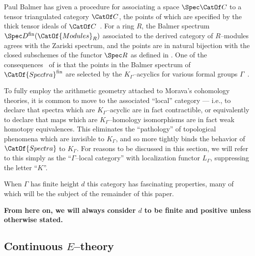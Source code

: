 \begin{remark}
Paul Balmer has given a procedure for associating a space $\Spec \CatOf C$ to a tensor triangulated category $\CatOf C$, the points of which are specified by the thick tensor ideals of $\CatOf C$~\cite{Balmer}.  For a ring $R$, the Balmer spectrum $\Spec D^{\text{fin}}(\CatOf{Modules}_R)$ associated to the derived category of $R$--modules agrees with the Zariski spectrum, and the points are in natural bijection with the closed subschemes of the functor $\Spec R$ as defined in .  One of the consequences~\cite[Theorem 7]{HopkinsSmith} of  is that the points in the Balmer spectrum of $\CatOf{Spectra}^{\text{fin}}$ are selected by the $K_\Gamma$--acyclics for various formal groups $\Gamma$~\cite[Corollary 9.5]{Balmer}.
\end{remark}




\label{KLocalCategory}

To fully employ the arithmetic geometry attached to Morava's cohomology theories, it is common to move to the associated ``local'' category --- i.e., to declare that spectra which are $K_\Gamma$--acyclic are in fact contractible, or equivalently to declare that maps which are $K_\Gamma$--homology isomorphisms are in fact weak homotopy equivalences.  This eliminates the ``pathology'' of topological phenomena which are invisible to $K_\Gamma$, and so more tightly binds the behavior of $\CatOf{Spectra}$ to $K_\Gamma$.  For reasons to be discussed in this section, we will refer to this simply as the ``$\Gamma$--local category'' with localization functor $L_\Gamma$, suppressing the letter ``$K$''.

When $\Gamma$ has finite height $d$ this category has fascinating properties, many of which will be the subject of the remainder of this paper.

\begin{center}
\textbf{From here on, we will always consider $d$ to be finite and positive unless otherwise stated.}
\end{center}

\subsection*{Continuous $E$--theory}\label{sec:ContinuousEThy}

